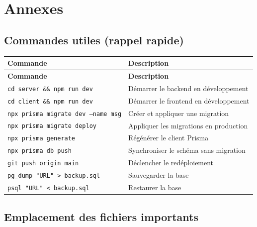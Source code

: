 \documentclass[12pt,a4paper]{report}
\begin{document}
\chapter{Annexes}

\section{Commandes utiles (rappel rapide)}

\begin{longtable}{|p{6cm}|p{8.5cm}|}
\hline
\textbf{Commande} & \textbf{Description} \\
\hline
\endfirsthead
\hline
\textbf{Commande} & \textbf{Description} \\
\hline
\endhead
\texttt{cd server \&\& npm run dev} & Démarrer le backend en développement \\
\hline
\texttt{cd client \&\& npm run dev} & Démarrer le frontend en développement \\
\hline
\texttt{npx prisma migrate dev --name msg} & Créer et appliquer une migration \\
\hline
\texttt{npx prisma migrate deploy} & Appliquer les migrations en production \\
\hline
\texttt{npx prisma generate} & Régénérer le client Prisma \\
\hline
\texttt{npx prisma db push} & Synchroniser le schéma sans migration \\
\hline
\texttt{git push origin main} & Déclencher le redéploiement \\
\hline
\texttt{pg\_dump "URL" > backup.sql} & Sauvegarder la base \\
\hline
\texttt{psql "URL" < backup.sql} & Restaurer la base \\
\hline
\end{longtable}

\section{Emplacement des fichiers importants}
\end{document}
